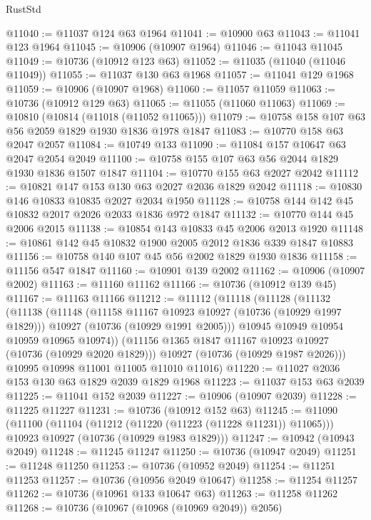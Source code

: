 \begin{lexlean}{RustStd}
\begin{coremodule}
@11040 := @11037 @124 @63 @1964
@11041 := @10900 @63
@11043 := @11041 @123 @1964
@11045 := @10906 (@10907 @1964)
@11046 := @11043 @11045
@11049 := @10736 (@10912 @123 @63)
@11052 := @11035 (@11040 (@11046 @11049))
@11055 := @11037 @130 @63 @1968
@11057 := @11041 @129 @1968
@11059 := @10906 (@10907 @1968)
@11060 := @11057 @11059
@11063 := @10736 (@10912 @129 @63)
@11065 := @11055 (@11060 @11063)
@11069 := @10810 (@10814 (@11018 (@11052 @11065)))
@11079 := @10758 @158 @107 @63 @56 @2059 @1829 @1930 @1836 @1978 @1847
@11083 := @10770 @158 @63 @2047 @2057
@11084 := @10749 @133
@11090 := @11084 @157 @10647 @63 @2047 @2054 @2049
@11100 := @10758 @155 @107 @63 @56 @2044 @1829 @1930 @1836 @1507 @1847
@11104 := @10770 @155 @63 @2027 @2042
@11112 := @10821 @147 @153 @130 @63 @2027 @2036 @1829 @2042
@11118 := @10830 @146 @10833 @10835 @2027 @2034 @1950
@11128 := @10758 @144 @142 @45 @10832 @2017 @2026 @2033 @1836 @972 @1847
@11132 := @10770 @144 @45 @2006 @2015
@11138 := @10854 @143 @10833 @45 @2006 @2013 @1920
@11148 := @10861 @142 @45 @10832 @1900 @2005 @2012 @1836 @339 @1847 @10883
@11156 := @10758 @140 @107 @45 @56 @2002 @1829 @1930 @1836
@11158 := @11156 @547 @1847
@11160 := @10901 @139 @2002
@11162 := @10906 (@10907 @2002)
@11163 := @11160 @11162
@11166 := @10736 (@10912 @139 @45)
@11167 := @11163 @11166
@11212 := @11112
    (@11118
      (@11128
        (@11132
          (@11138
            (@11148
              (@11158 @11167 @10923 @10927 (@10736 (@10929 @1997 @1829)))
              @10927
              (@10736 (@10929 @1991 @2005)))
            @10945
            @10949
            @10954
            @10959
            @10965
            @10974))
        (@11156 @1365 @1847 @11167 @10923 @10927 (@10736 (@10929 @2020 @1829)))
        @10927
        (@10736 (@10929 @1987 @2026)))
      @10995
      @10998
      @11001
      @11005
      @11010
      @11016)
@11220 := @11027 @2036 @153 @130 @63 @1829 @2039 @1829 @1968
@11223 := @11037 @153 @63 @2039
@11225 := @11041 @152 @2039
@11227 := @10906 (@10907 @2039)
@11228 := @11225 @11227
@11231 := @10736 (@10912 @152 @63)
@11245 := @11090
    (@11100
      (@11104 (@11212 (@11220 (@11223 (@11228 @11231)) @11065)))
      @10923
      @10927
      (@10736 (@10929 @1983 @1829)))
@11247 := @10942 (@10943 @2049)
@11248 := @11245 @11247
@11250 := @10736 (@10947 @2049)
@11251 := @11248 @11250
@11253 := @10736 (@10952 @2049)
@11254 := @11251 @11253
@11257 := @10736 (@10956 @2049 @10647)
@11258 := @11254 @11257
@11262 := @10736 (@10961 @133 @10647 @63)
@11263 := @11258 @11262
@11268 := @10736 (@10967 (@10968 (@10969 @2049)) @2056)

\end{coremodule}
\end{lexlean}
